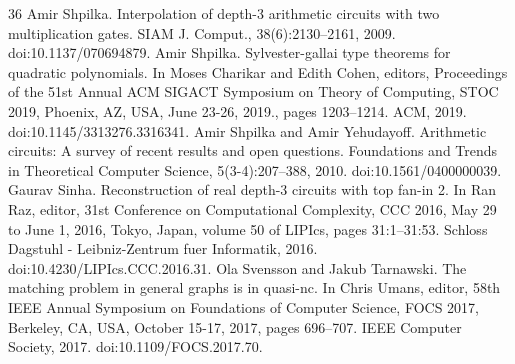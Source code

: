 \documentclass[10pt,a4paper]{article}
\begin{document}
\begin{thebibliography}{36}
Amir Shpilka. Interpolation of depth-3 arithmetic circuits with two multiplication gates. SIAM J. Comput., 38(6):2130–2161, 2009. doi:10.1137/070694879.
Amir Shpilka. Sylvester-gallai type theorems for quadratic polynomials. In Moses Charikar and Edith Cohen, editors, Proceedings of the 51st Annual ACM SIGACT Symposium on Theory of Computing, STOC 2019, Phoenix, AZ, USA, June 23-26, 2019., pages 1203–1214. ACM, 2019. doi:10.1145/3313276.3316341.
Amir Shpilka and Amir Yehudayoff. Arithmetic circuits: A survey of recent results and open questions. Foundations and Trends in Theoretical Computer Science, 5(3-4):207–388, 2010. doi:10.1561/0400000039.
Gaurav Sinha. Reconstruction of real depth-3 circuits with top fan-in 2. In Ran Raz, editor, 31st Conference on Computational Complexity, CCC 2016, May 29 to June 1, 2016, Tokyo, Japan, volume 50 of LIPIcs, pages 31:1–31:53. Schloss Dagstuhl - Leibniz-Zentrum fuer Informatik, 2016. doi:10.4230/LIPIcs.CCC.2016.31.
Ola Svensson and Jakub Tarnawski. The matching problem in general graphs is in quasi-nc. In Chris Umans, editor, 58th IEEE Annual Symposium on Foundations of Computer Science, FOCS 2017, Berkeley, CA, USA, October 15-17, 2017, pages 696–707. IEEE Computer Society, 2017. doi:10.1109/FOCS.2017.70.
\end{thebibliography}
\end{document}
